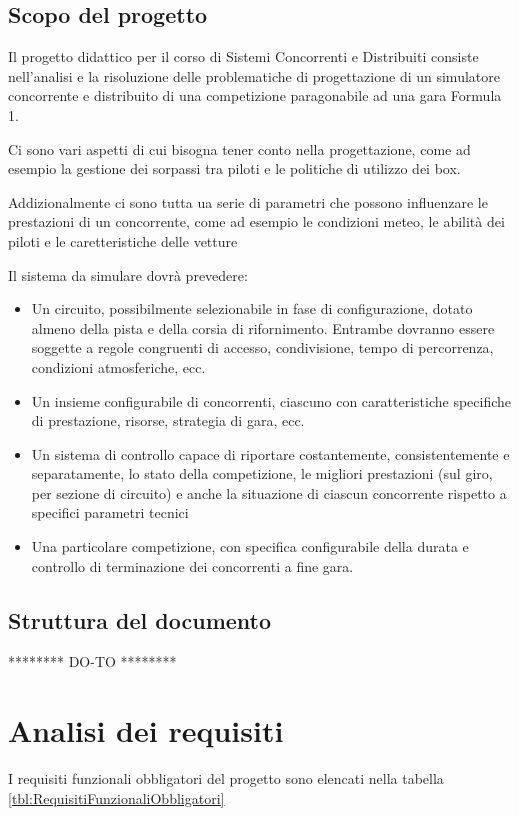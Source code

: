 \documentclass[a4paper,11pt, twoside]{book}
\begin{document}
    \section{Scopo del progetto}
      Il progetto didattico per il corso di Sistemi Concorrenti e Distribuiti consiste nell'analisi e la risoluzione 
      delle problematiche di progettazione di un simulatore concorrente e distribuito 
      di una competizione paragonabile ad una gara Formula 1.
      
      Ci sono vari aspetti di cui bisogna tener conto nella progettazione, come ad esempio la gestione
      dei sorpassi tra piloti e le politiche di utilizzo dei box.
      
      Addizionalmente ci sono tutta ua serie di parametri che possono influenzare le prestazioni di un concorrente,
      come ad esempio le condizioni meteo, le abilità dei piloti e le caretteristiche delle vetture

      Il sistema da simulare dovrà prevedere:
      \begin{itemize}
	\item Un circuito, possibilmente selezionabile in fase di configurazione, dotato almeno della pista e della corsia di 
	  rifornimento.
	  Entrambe dovranno essere soggette a regole congruenti di accesso, condivisione, 
	  tempo di percorrenza, condizioni atmosferiche, ecc.
	\item Un insieme configurabile di concorrenti, ciascuno con caratteristiche specifiche di prestazione, risorse, 
	  strategia di gara, ecc.
	\item Un sistema di controllo capace di riportare costantemente, consistentemente e separatamente, 
	  lo stato della competizione, le migliori prestazioni (sul giro, per sezione di circuito) e anche la 
	  situazione di ciascun concorrente rispetto a specifici parametri tecnici
	\item Una particolare competizione, con specifica configurabile della durata e controllo di terminazione 
	  dei concorrenti a fine gara.
      \end{itemize}
    
    \section{Struttura del documento}
      ******** DO-TO ********
  
  \chapter{Analisi dei requisiti}
    I requisiti funzionali obbligatori del progetto sono elencati nella tabella \ref{tbl:RequisitiFunzionaliObbligatori}
    
\end{document}
